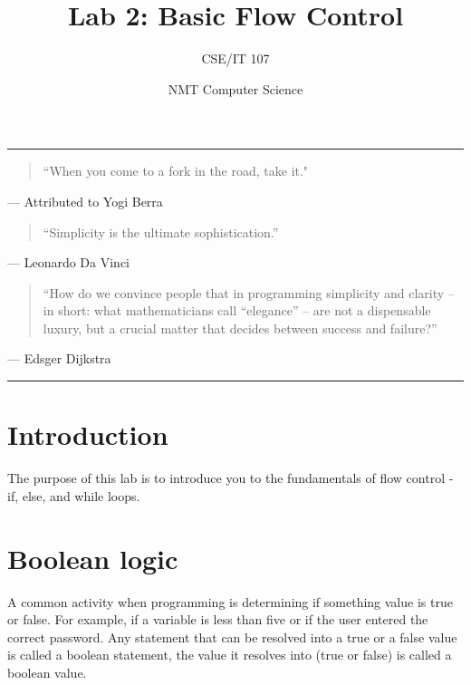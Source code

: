 \documentclass[12pt,hidelinks]{article}
\title{Lab 2: Basic Flow Control}
\author{CSE/IT 107}
\date{NMT Computer Science}
\begin{document}
\maketitle

\hrule

\begin{quotation}
``When you come to a fork in the road, take it."
\end{quotation}
\begin{flushright}
--- Attributed to Yogi Berra
\end{flushright}

\begin{quotation}
``Simplicity is the ultimate sophistication.''
\end{quotation}
\begin{flushright}
--- Leonardo Da Vinci
\end{flushright}

\begin{quotation}
``How do we convince people that in programming simplicity and clarity -- in
short: what mathematicians call ``elegance'' -- are not a dispensable luxury, but
a crucial matter that decides between success and failure?''
\end{quotation}
\begin{flushright}
--- Edsger Dijkstra
\end{flushright}

\hrule

\section{Introduction}
The purpose of this lab is to introduce you to the fundamentals of flow control - if, else, and while loops.

\section{Boolean logic}
A common activity when programming is determining if something value is true or false. For example, if a variable is less than five or if the user entered the correct password. Any statement that can be resolved into a true or a false value is called a boolean statement, the value it resolves into (true or false) is called a boolean value.
\end{document}
